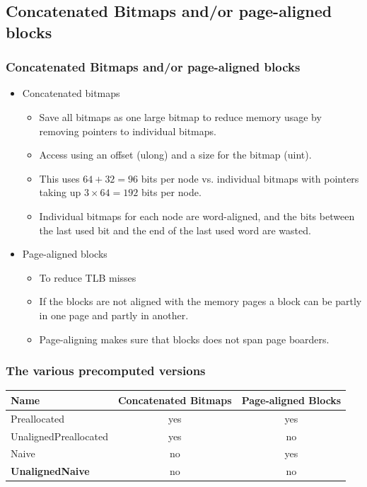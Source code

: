 \documentclass{beamer}
\begin{document}
\subsection{Concatenated Bitmaps and/or page-aligned blocks}
\begin{frame}
\frametitle{Concatenated Bitmaps and/or page-aligned blocks}
\begin{itemize}
\item Concatenated bitmaps
\begin{itemize}
\item Save all bitmaps as one large bitmap to reduce memory usage by removing pointers to individual bitmaps.
\item Access using an offset (ulong) and a size for the bitmap (uint).
\item This uses $64+32=96$ bits per node vs. individual bitmaps with pointers taking up $3 \times 64=192$ bits per node.
\item Individual bitmaps for each node are word-aligned, and the bits between the last used bit and the end of the last used word are wasted.
\end{itemize}
\item Page-aligned blocks
\begin{itemize}
\item To reduce TLB misses
\item If the blocks are not aligned with the memory pages a block can be partly in one page and partly in another.
\item Page-aligning makes sure that blocks does not span page boarders.
\end{itemize}
\end{itemize}
\end{frame}


\begin{frame}
\frametitle{The various precomputed versions}
\begin{tabular}{|lcc|}
\hline
Name						& Concatenated Bitmaps	& Page-aligned Blocks	\\ \hline
Preallocated				& yes					& yes					\\ \hline
UnalignedPreallocated	& yes					& no						\\ \hline
Naive					& no						& yes					\\ \hline
\textbf{UnalignedNaive}			& no						& no						\\ \hline
\end{tabular}\\
\end{frame}
\end{document}
